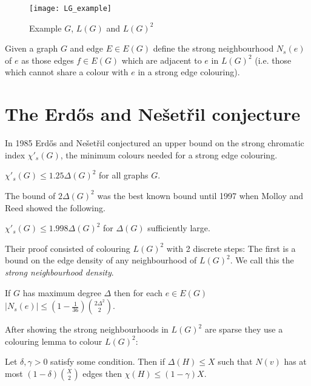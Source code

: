 \begin{figure}[ht]
    \centering
    \texttt{[image: LG\_example]}
    \caption{Example $G$, $L(G)$ and $L(G)^2$}
    \label{fig:lg_example}
\end{figure}

\begin{definition}
    Given a graph $G$ and edge $E \in E(G)$ define the strong neighbourhood
    $N_s(e)$ of $e$ as those edges $f \in E(G)$ which are adjacent to $e$ in 
    $L(G)^2$ (i.e. those which cannot share a colour with $e$ in a strong edge colouring).
\end{definition}

\section{The Erd\H{o}s and Nešetřil conjecture}

In 1985 Erd\H{o}s and Nešetřil \cite{faudreeInducedMatchingsBipartite1989} conjectured an
upper bound on the strong chromatic index $\chi'_s(G)$, the minimum colours needed for
a strong edge colouring.

\begin{conjecture}
    $\chi'_s(G) \leq 1.25\Delta(G)^2$ for all graphs $G$.
\end{conjecture}

The bound of $2\Delta(G)^2$ was the best known bound until 1997 when Molloy and Reed
showed the following.
\begin{knowntheorem}
    $\chi'_s(G) \leq 1.998\Delta(G)^2$ for $\Delta(G)$ sufficiently large.
\end{knowntheorem}

Their proof consisted of colouring $L(G)^2$ with 2 discrete steps:
The first is a bound on the edge density of any neighbourhood of $L(G)^2$. We call
this the \textit{strong neighbourhood density}.
\begin{knownlemma}
    If $G$ has maximum degree $\Delta$ then for each $e\in E(G)$
    $|N_s(e)| \leq (1-\frac{1}{36})\binom{2\Delta^2}{2}$.
\end{knownlemma}
After showing the strong neighbourhoods in $L(G)^2$ are sparse they use a colouring
lemma to colour $L(G)^2$:
\begin{knownlemma}
    Let $\delta, \gamma > 0$ satisfy some condition. Then if
    $\Delta(H) \leq X$ such that $N(v)$ has at most $(1-\delta)\binom{X}{2}$ edges
    then $\chi(H)\leq (1-\gamma)X$.
\end{knownlemma}

